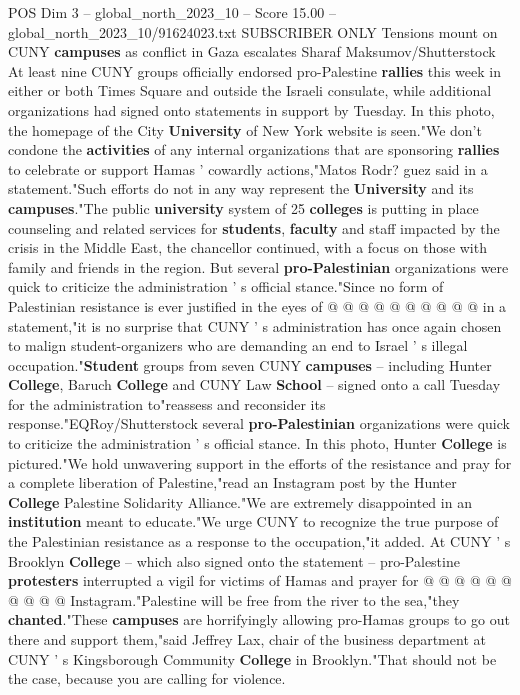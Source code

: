 \begin{textsample}{POS Dim 3 – global\_north\_2023\_10 – Score 15.00 – global\_north\_2023\_10/91624023.txt}  \label{ex:f3_pos_199}
SUBSCRIBER ONLY Tensions mount on CUNY \textbf{campuses} as conflict in Gaza escalates Sharaf Maksumov/Shutterstock At least nine CUNY groups officially endorsed pro-Palestine \textbf{rallies} this week in either or both Times Square and outside the Israeli consulate, while additional organizations had signed onto statements in support by Tuesday.
In this photo, the homepage of the City \textbf{University} of New York website is seen."We don't condone the \textbf{activities} of any internal organizations that are sponsoring \textbf{rallies} to celebrate or support Hamas ' cowardly actions,"Matos Rodr? guez said in a statement."Such efforts do not in any way represent the \textbf{University} and its \textbf{campuses}."The public \textbf{university} system of 25 \textbf{colleges} is putting in place counseling and related services for \textbf{students}, \textbf{faculty} and staff impacted by the crisis in the Middle East, the chancellor continued, with a focus on those with family and friends in the region.
But several \textbf{pro-Palestinian} organizations were quick to criticize the administration ' s official stance."Since no form of Palestinian resistance is ever justified in the eyes of @ @ @ @ @ @ @ @ @ @ in a statement,"it is no surprise that CUNY ' s administration has once again chosen to malign student-organizers who are demanding an end to Israel ' s illegal occupation."\textbf{Student} groups from seven CUNY \textbf{campuses} -- including Hunter \textbf{College}, Baruch \textbf{College} and CUNY Law \textbf{School} -- signed onto a call Tuesday for the administration to"reassess and reconsider its response."EQRoy/Shutterstock several \textbf{pro-Palestinian} organizations were quick to criticize the administration ' s official stance.
In this photo, Hunter \textbf{College} is pictured."We hold unwavering support in the efforts of the resistance and pray for a complete liberation of Palestine,"read an Instagram post by the Hunter \textbf{College} Palestine Solidarity Alliance."We are extremely disappointed in an \textbf{institution} meant to educate."We urge CUNY to recognize the true purpose of the Palestinian resistance as a response to the occupation,"it added.
At CUNY ' s Brooklyn \textbf{College} -- which also signed onto the statement -- pro-Palestine \textbf{protesters} interrupted a vigil for victims of Hamas and prayer for @ @ @ @ @ @ @ @ @ @ Instagram."Palestine will be free from the river to the sea,"they \textbf{chanted}."These \textbf{campuses} are horrifyingly allowing pro-Hamas groups to go out there and support them,"said Jeffrey Lax, chair of the business department at CUNY ' s Kingsborough Community \textbf{College} in Brooklyn."That should not be the case, because you are calling for violence.

\end{textsample}
